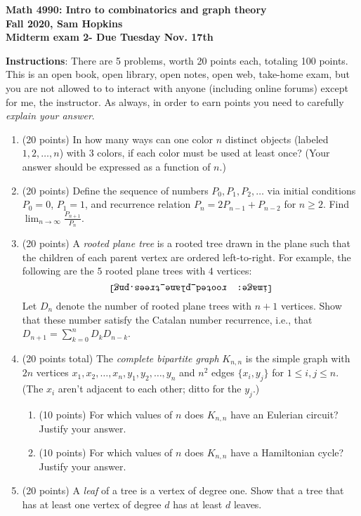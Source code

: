 \documentclass[11pt]{article}
\begin{document}
\begin{center}
{\bf Math 4990: Intro to combinatorics and graph theory \\
Fall 2020, Sam Hopkins \\
Midterm exam 2- Due Tuesday Nov. 17th}
\end{center}

\thispagestyle{empty}

{\bf Instructions}: There are 5 problems, worth 20 points each, totaling 100 points. This is an open book, open library, open notes, open web, take-home exam, but you are not allowed to to interact with anyone (including online forums) except for me, the instructor. As always, in order to earn points you need to carefully \emph{explain your answer}.

\begin{enumerate}

\item (20 points) In how many ways can one color $n$ distinct objects (labeled $1,2,\ldots,n$) with $3$ colors, if each color must be used at least once? (Your answer should be expressed as a function of $n$.)

\item (20 points) Define the sequence of numbers $P_0,P_1,P_2,\ldots$ via initial conditions $P_0 = 0$, $P_1 =1$, and recurrence relation $P_{n}=2P_{n-1}+P_{n-2}$ for $n\geq 2$. Find $\displaystyle \lim_{n \to \infty} \frac{P_{n+1}}{P_{n}}$.

\item (20 points) A \emph{rooted plane tree} is a rooted tree drawn in the plane such that the children of each parent vertex are ordered left-to-right. For example, the following are the $5$ rooted plane trees with $4$ vertices:
\[\rotatebox{180}{\texttt{[image: rooted\_plane\_trees.png]}}\]
Let $D_n$ denote the number of rooted plane trees with $n+1$ vertices. Show that these number satisfy the Catalan number recurrence, i.e., that $D_{n+1} = \sum_{k=0}^{n} D_{k}D_{n-k}$.

\item (20 points total) The \emph{complete bipartite graph} $K_{n,n}$ is the simple graph with $2n$ vertices $x_1,x_2,\ldots,x_n,y_1,y_2,\ldots,y_n$ and $n^2$ edges $\{x_i,y_j\}$ for $1 \leq i,j \leq n$. (The $x_i$ aren't adjacent to each other; ditto for the $y_j$.) 
\begin{enumerate}
\item (10 points) For which values of $n$ does $K_{n,n}$ have an Eulerian circuit? Justify your answer.
\item (10 points) For which values of $n$ does $K_{n,n}$ have a Hamiltonian cycle? Justify your answer.
\end{enumerate}

\item (20 points) A \emph{leaf} of a tree is a vertex of degree one. Show that a tree that has at least one vertex of degree $d$ has at least $d$ leaves.

\end{enumerate}
\end{document}
